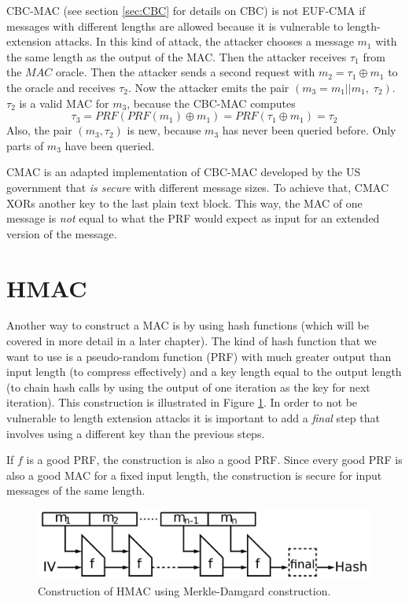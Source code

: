 CBC-MAC (see section \ref{sec:CBC} for details on CBC) is not EUF-CMA if messages with different lengths are allowed because it is vulnerable to length-extension attacks.
In this kind of attack, the attacker chooses a message $m_1$ with the same length as the output of the MAC.
Then the attacker receives $\tau_1$ from the $MAC$ oracle.
Then the attacker sends a second request with $m_2 = \tau_1 \oplus m_1$ to the oracle and receives $\tau_2$.
Now the attacker emits the pair $(m_3 = m_1||m_1,\; \tau_2)$.
$\tau_2$ is a valid MAC for $m_3$, because the CBC-MAC computes
$$\tau_3 = PRF(PRF(m_1) \oplus m_1) = PRF(\tau_1 \oplus m_1) = \tau_2$$
Also, the pair $(m_3,\tau_2)$ is new, because $m_3$ has never been queried before.
Only parts of $m_3$ have been queried.

CMAC is an adapted implementation of CBC-MAC developed by the US government that \emph{is secure} with different message sizes.
To achieve that, CMAC XORs another key to the last plain text block.
This way, the MAC of one message is \emph{not} equal to what the PRF would expect as input for an extended version of the message.

\section{HMAC}

Another way to construct a MAC is by using hash functions (which will be covered in more detail in a later chapter). The kind of hash function that we want to use is a pseudo-random function (PRF) with much greater output than input length (to compress effectively) and a key length equal to the output length (to chain hash calls by using the output of one iteration as the key for next iteration). This construction is illustrated in Figure \ref{fig:HMAC}. In order to not be vulnerable to length extension attacks it is important to add a \emph{final} step that involves using a different key than the previous steps.

If $f$ is a good PRF, the construction is also a good PRF. Since every good PRF is also a good MAC for a fixed input length, the construction is secure for input messages of the same length.

\begin{figure}[H]
    \center
    \includegraphics[width=\linewidth]{gfx/HMAC.png}
    \caption{Construction of HMAC using Merkle-Damgard construction.}
    \label{fig:HMAC}
\end{figure}

